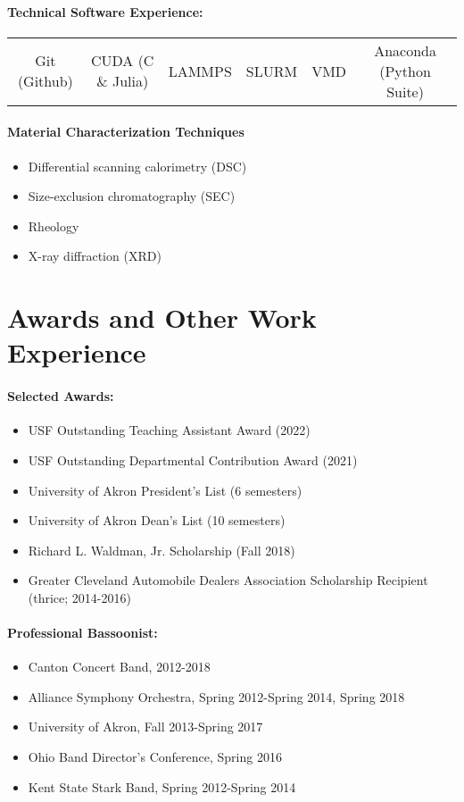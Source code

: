 \documentclass{my_cv}
\begin{document}
\paragraph{Technical Software Experience:}
\begin{center}
\begin{tabular}{c|c|c|c|c|c}
   Git (Github) & CUDA (C \& Julia) & LAMMPS & SLURM & VMD & Anaconda (Python Suite) \\
\end{tabular}
\end{center}

\paragraph{Material Characterization Techniques}

\begin{itemize}
    \item Differential scanning calorimetry (DSC)
    \item Size-exclusion chromatography (SEC)
    \item Rheology
    \item X-ray diffraction (XRD)
\end{itemize}

\section{Awards and Other Work Experience}

\paragraph{Selected Awards:}
\begin{itemize}
    \item USF Outstanding Teaching Assistant Award (2022)
    \item USF Outstanding Departmental Contribution Award (2021)
    \item University of Akron President's List (6 semesters)
    \item University of Akron Dean's List (10 semesters)
    \item Richard L. Waldman, Jr. Scholarship (Fall 2018)
    \item Greater Cleveland Automobile Dealers Association Scholarship Recipient (thrice; 2014-2016)
\end{itemize}

\paragraph{Professional Bassoonist:}
\begin{itemize}
	\item Canton Concert Band, 2012-2018
	\item Alliance Symphony Orchestra, Spring 2012-Spring 2014, Spring 2018
    \item University of Akron, Fall 2013-Spring 2017
	\item Ohio Band Director’s Conference, Spring 2016
	\item Kent State Stark Band, Spring 2012-Spring 2014
\end{itemize}
\end{document}
